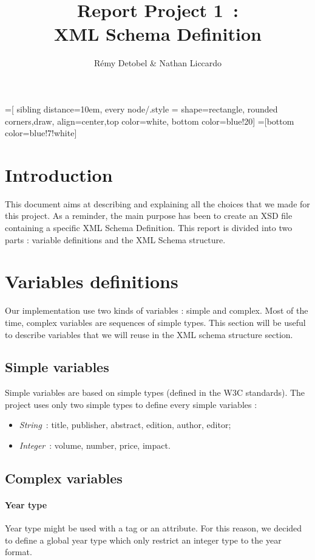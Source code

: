 \documentclass{article}
\author{R\'emy Detobel \& Nathan Liccardo}
\title{Report Project 1~:\\XML Schema Definition}
\begin{document}
=[
  sibling distance=10em,
  every node/.style = {shape=rectangle, rounded corners,draw, align=center,top color=white, bottom color=blue!20}]
=[bottom color=blue!7!white]

\maketitle

\section{Introduction}
This document aims at describing and explaining all the choices that we made for this project. As a reminder, the main purpose has been to create an XSD file containing a specific XML Schema Definition. This report is divided into two parts : variable definitions and the XML Schema structure. 

\section{Variables definitions}
  \label{sec:variables}
  Our implementation use two kinds of variables : simple and complex. Most of the time, complex variables are sequences of simple types. This section will be useful to describe variables that we will reuse in the XML schema structure section.
\subsection{Simple variables}
Simple variables are based on simple types (defined in the W3C standards). The project uses only two simple types to define every simple variables :
  \begin{itemize}
    \item \textit{String}~: title, publisher, abstract, edition, author, editor;
    \item \textit{Integer}~: volume, number, price, impact.
  \end{itemize}
\subsection{Complex variables}
\paragraph{Year type}
Year type might be used with a tag or an attribute. For this reason, we decided to define a global year type which only restrict an integer type to the year format.
\end{document}
